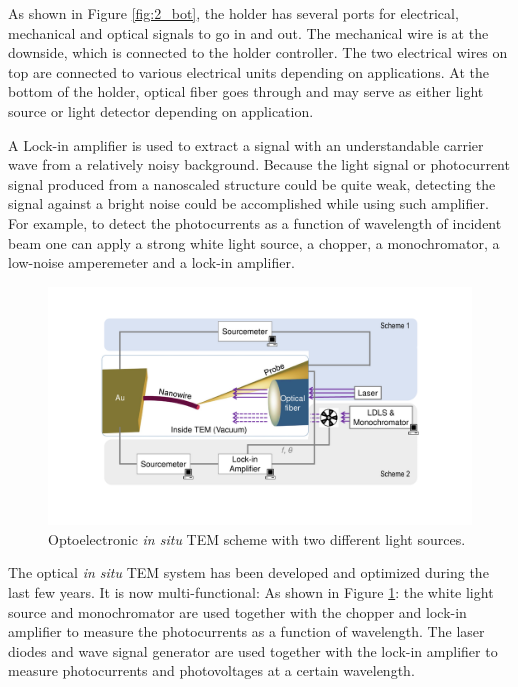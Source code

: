 As shown in Figure \ref{fig:2_bot}, the holder has several ports for electrical, mechanical and optical signals to go in and out. 
The mechanical wire is at the downside, which is connected to the holder controller. 
The two electrical wires on top are connected to various electrical units depending on applications. 
At the bottom of the holder, optical fiber goes through and may serve as either light source or light detector depending on application. 

A Lock-in amplifier is used to extract a signal with an understandable carrier wave from a relatively noisy background. 
Because the light signal or photocurrent signal produced from a nanoscaled structure could be quite weak, detecting the signal against a bright noise could be accomplished while using such amplifier. 
For example, to detect the photocurrents as a function of wavelength of incident beam one can apply a strong white light source, a chopper, a monochromator, a low-noise amperemeter and a lock-in amplifier. 

\begin{figure}
\centering
\includegraphics[width=\textwidth]{figures/figure6_1}
\caption[Optoelectronic {\em in situ} TEM scheme]{Optoelectronic {\em in situ} TEM scheme with two different light sources. }
\label{fig:6_1}
\end{figure}

The optical {\em in situ} TEM system has been developed and optimized during the last few years. It is now multi-functional: 
As shown in Figure \ref{fig:6_1}: the white light source and monochromator are used together with the chopper and lock-in amplifier to measure the photocurrents as a function of wavelength. The laser diodes and wave signal generator are used together with the lock-in amplifier to measure photocurrents and photovoltages at a certain wavelength. 

